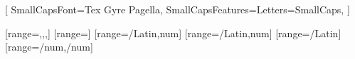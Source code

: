 
%
%

\setmainfont{Palatino}[
  SmallCapsFont={Tex Gyre Pagella},
  SmallCapsFeatures={Letters=SmallCaps},
]

[range={\mathsfit,\mathsfup,\mathbfsfit,\mathbfsfup}]
[range=\mathcal]
[range=\mathsfit/{Latin,num}]
[range=\mathsfup/{Latin,num}]
[range=\mathbfsfit/{Latin}]
[range={\mathbfsfit/{num},\mathbfsfup/{num}}]

\setsansfont{Myriad Pro}

\linespread{1.07}
